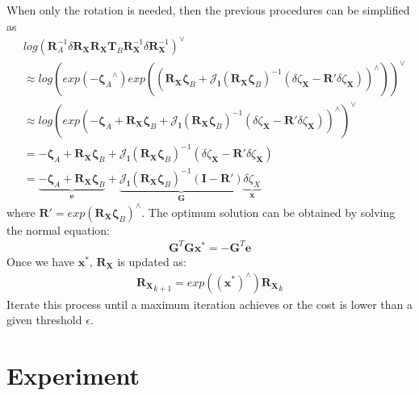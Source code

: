 \documentclass[a4paper]{report}
\begin{document}
When only the rotation is needed, then the previous procedures can be simplified as
\begin{align}
&log \left( \mathbf{R}_{A}^{-1}{\delta\mathbf{R}_{\mathbf{X}}}\mathbf{R}_\mathbf{X}\mathbf{T}_{B}\mathbf{R}_{\mathbf{X}}^{-1}{\delta\mathbf{R}_{\mathbf{X}}^{-1}} \right)^{\vee} \\
&\approx log
\left( 
	exp\left(-{\mathbf{\zeta}_A}^{\wedge}\right) exp
\left(
\left( 
	\mathbf{R}_\mathbf{X}{\mathbf{\zeta}_B} + \mathbf{\mathcal{J}_{l}}
\left(
	\mathbf{R}_\mathbf{X}{\mathbf{\zeta}_B}
\right) ^{-1} 
\left( 
	\delta \zeta_{\mathbf{X}} - \mathbf{R}' \delta \zeta_{\mathbf{X}}
\right)
\right)^{\wedge}
\right)
\right)^{\vee} \\
&\approx log
\left(
	exp 
\left(
	-{\mathbf{\zeta}_A}+\mathbf{R}_\mathbf{X}{\mathbf{\zeta}_B} + \mathbf{\mathcal{J}_{l}}
\left(
	\mathbf{R}_\mathbf{X}{\mathbf{\zeta}_B}
\right) ^{-1} 
\left( 
	\delta \zeta_{\mathbf{X}} - \mathbf{R}' \delta \zeta_{\mathbf{X}}
\right) 
\right)^{\wedge}
\right)^{\vee} \\
&=-{\mathbf{\zeta}_A}+\mathbf{R}_\mathbf{X}{\mathbf{\zeta}_B} + \mathbf{\mathcal{J}_{l}}
\left(
	\mathbf{R}_\mathbf{X}{\mathbf{\zeta}_B}
\right) ^{-1} 
\left( 
	\delta \zeta_{\mathbf{X}} - \mathbf{R}' \delta \zeta_{\mathbf{X}}
\right) \\
&=\underbrace{-{\mathbf{\zeta}_A}+\mathbf{R}_\mathbf{X}{\mathbf{\zeta}_B}}_{\mathbf{e}} + \underbrace{\mathbf{\mathcal{J}_{l}}
\left(
	\mathbf{R}_\mathbf{X}{\mathbf{\zeta}_B}
\right) ^{-1} 
\left( 
\mathbf{I} - \mathbf{R}' 
\right)}_{\mathbf{G}} \underbrace{\delta \zeta_{X}}_{\mathbf{x}}
\end{align}
where $\mathbf{R}' = exp\left(\mathbf{R}_\mathbf{X}{\mathbf{\zeta}_B}\right)^{\wedge}$.
The optimum solution can be obtained by solving the normal equation:
\begin{align}
\mathbf{G}^T\mathbf{G}\mathbf{x}^*=-\mathbf{G}^T\mathbf{e}
\end{align}
Once we have $\mathbf{x}^*$, $\mathbf{R}_{\mathbf{X}}$ is updated as:
\begin{align}
{\mathbf{R}_{\mathbf{X}}}_{k+1}=exp\left(\left(\mathbf{x}^*\right)^{\wedge}\right){\mathbf{R}_{\mathbf{X}}}_k
\end{align}
Iterate this process until a maximum iteration achieves or the cost is lower than a given threshold $\epsilon$.
\section{Experiment}
\end{document}
